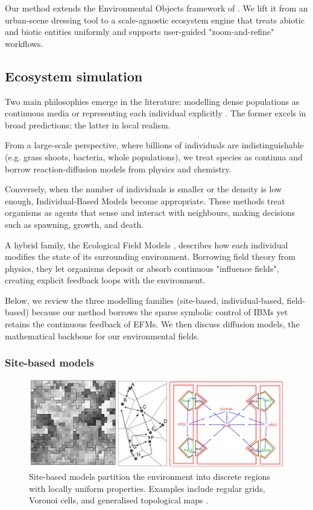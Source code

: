 Our method extends the Environmental Objects framework of \citep{Grosbellet2016}. We lift it from an urban-scene dressing tool to a scale-agnostic ecosystem engine that treats abiotic and biotic entities uniformly and supports user-guided "zoom-and-refine" workflows.

\subsection{Ecosystem simulation}

Two main philosophies emerge in the literature: modelling dense populations as continuous media \cite{Turing1952} or representing each individual explicitly \cite{Czaran1998}. The former excels in broad predictions; the latter in local realism.

From a large-scale perspective, where billions of individuals are indistinguishable (e.g. grass shoots, bacteria, whole populations), we treat species as continua and borrow reaction-diffusion models from physics and chemistry.

Conversely, when the number of individuals is smaller or the density is low enough, Individual-Based Models become appropriate. These methods treat organisms as agents that sense and interact with neighbours, making decisions such as spawning, growth, and death.

A hybrid family, the Ecological Field Models \cite{Wu1985}, describes how each individual modifies the state of its surrounding environment. Borrowing field theory from physics, they let organisms deposit or absorb continuous "influence fields", creating explicit feedback loops with the environment.

Below, we review the three modelling families (site-based, individual-based, field-based) because our method borrows the sparse symbolic control of IBMs yet retains the continuous feedback of EFMs. We then discuss diffusion models, the mathematical backbone for our environmental fields.

\subsubsection{Site-based models}

\begin{figure}[H]
    \centering
    \includegraphics[width=.8\linewidth]{grid-based-modeling-teaser.png}
    \caption{Site-based models partition the environment into discrete regions with locally uniform properties. Examples include regular grids, Voronoi cells, and generalised topological maps \cite{Nelson2012,Lemiere2023}.}
    \label{fig:env-obj-grid-based-models}
\end{figure}

